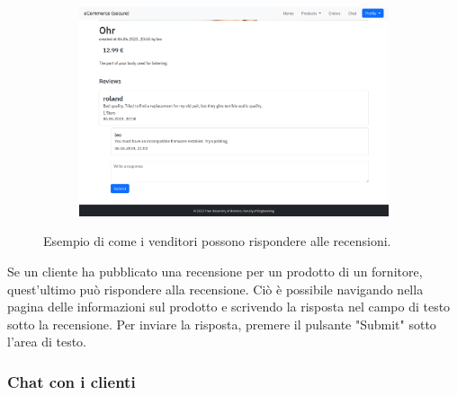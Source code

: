 \documentclass[conference,onecolumn,a4paper]{IEEEtran}
\begin{document}
{\begin{figure}[H]
    \centering
    \begin{subfigure}[b]{0.4\linewidth}
        \includegraphics[width=\linewidth]{resources/response.png}
    \end{subfigure}
    \caption{Esempio di come i venditori possono rispondere alle recensioni.}
\end{figure}

Se un cliente ha pubblicato una recensione per un prodotto di un fornitore, quest'ultimo può rispondere alla recensione. Ciò è possibile navigando nella pagina delle informazioni sul prodotto e scrivendo la risposta nel campo di testo sotto la recensione. Per inviare la risposta, premere il pulsante "Submit" sotto l'area di testo.

\subsubsection{Chat con i clienti}

}
\end{document}
